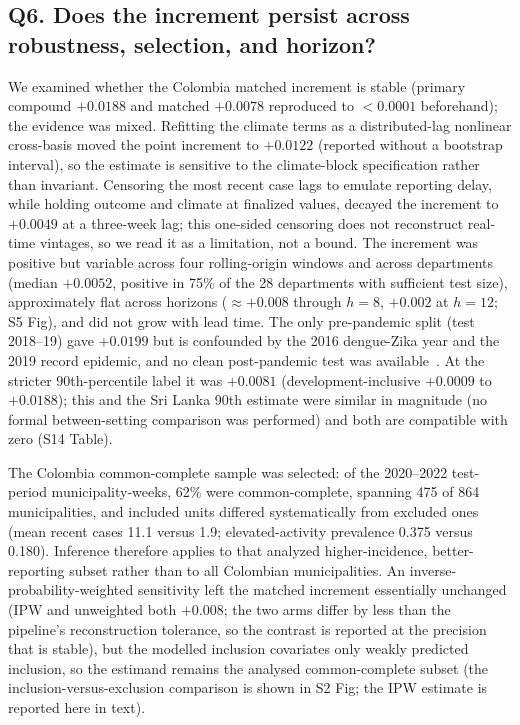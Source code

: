 \documentclass[11pt,a4paper]{article}
\begin{document}
\subsection{Q6. Does the increment persist across robustness, selection, and horizon?}\label{sec:robustness}
We examined whether the Colombia matched increment is stable (primary compound $+0.0188$ and matched $+0.0078$ reproduced to $<0.0001$ beforehand); the evidence was mixed. Refitting the climate terms as a distributed-lag nonlinear cross-basis moved the point increment to $+0.0122$ (reported without a bootstrap interval), so the estimate is sensitive to the climate-block specification rather than invariant. Censoring the most recent case lags to emulate reporting delay, while holding outcome and climate at finalized values, decayed the increment to $+0.0049$ at a three-week lag; this one-sided censoring does not reconstruct real-time vintages, so we read it as a limitation, not a bound. The increment was positive but variable across four rolling-origin windows and across departments (median $+0.0052$, positive in 75\% of the 28 departments with sufficient test size), approximately flat across horizons ($\approx+0.008$ through $h=8$, $+0.002$ at $h=12$; S5 Fig), and did not grow with lead time. The only pre-pandemic split (test 2018--19) gave $+0.0199$ but is confounded by the 2016 dengue-Zika year and the 2019 record epidemic, and no clean post-pandemic test was available~\cite{PAHO2023,ValleDelCauca2024}. At the stricter 90th-percentile label it was $+0.0081$ (development-inclusive $+0.0009$ to $+0.0188$); this and the Sri Lanka 90th estimate were similar in magnitude (no formal between-setting comparison was performed) and both are compatible with zero (S14 Table).

The Colombia common-complete sample was selected: of the 2020--2022 test-period municipality-weeks, 62\% were common-complete, spanning 475 of 864 municipalities, and included units differed systematically from excluded ones (mean recent cases 11.1 versus 1.9; elevated-activity prevalence 0.375 versus 0.180). Inference therefore applies to that analyzed higher-incidence, better-reporting subset rather than to all Colombian municipalities. An inverse-probability-weighted sensitivity left the matched increment essentially unchanged (IPW and unweighted both $+0.008$; the two arms differ by less than the pipeline's reconstruction tolerance, so the contrast is reported at the precision that is stable), but the modelled inclusion covariates only weakly predicted inclusion, so the estimand remains the analysed common-complete subset (the inclusion-versus-exclusion comparison is shown in S2 Fig; the IPW estimate is reported here in text).
\end{document}
